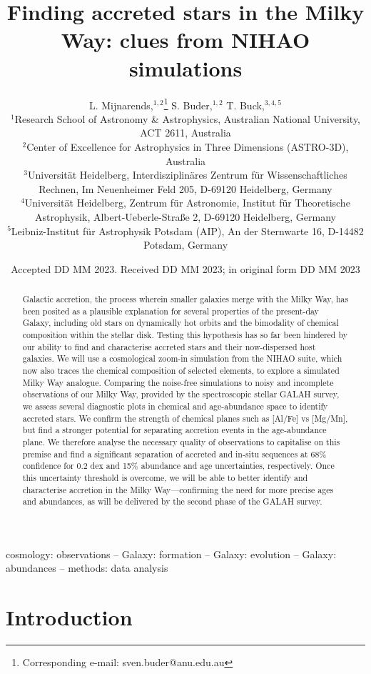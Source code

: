 \documentclass[fleqn,usenatbib]{mnras}
\title[Accreted stars in NIHAO and GALAH]{Finding accreted stars in the Milky Way: clues from NIHAO simulations}
\author[L. Mijnarends, S. Buder and T. Buck]{
L. Mijnarends,$^{1,2}$\thanks{Corresponding e-mail: sven.buder@anu.edu.au}
S. Buder,$^{1,2}$
T. Buck,$^{3,4,5}$
\\
$^{1}$Research School of Astronomy \& Astrophysics, Australian National University, ACT 2611, Australia\\
$^{2}$Center of Excellence for Astrophysics in Three Dimensions (ASTRO-3D), Australia\\
$^{3}$Universit{\"a}t Heidelberg, Interdisziplin{\"a}res Zentrum f{\"u}r Wissenschaftliches Rechnen, Im Neuenheimer Feld 205, D-69120 Heidelberg, Germany\\
$^{4}$Universit{\"a}t Heidelberg, Zentrum f{\"u}r Astronomie, Institut f{\"u}r Theoretische Astrophysik, Albert-Ueberle-Straße 2, D-69120 Heidelberg, Germany\\
$^{5}$Leibniz-Institut f{\"u}r Astrophysik Potsdam (AIP), An der Sternwarte 16, D-14482 Potsdam, Germany
}
\date{Accepted DD MM 2023. Received DD MM 2023; in original form DD MM 2023}
\begin{document}
\label{firstpage}
\pagerange{\pageref{firstpage}--\pageref{lastpage}}
\maketitle

\begin{abstract}
Galactic accretion, the process wherein smaller galaxies merge with the Milky Way, has been posited as a plausible explanation for several properties of the present-day Galaxy, including old stars on dynamically hot orbits and the bimodality of chemical composition within the stellar disk. Testing this hypothesis has so far been hindered by our ability to find and characterise accreted stars and their now-dispersed host galaxies. We will use a cosmological zoom-in simulation from the NIHAO suite, which now also traces the chemical composition of selected elements, to explore a simulated Milky Way analogue. Comparing the noise-free simulations to noisy and incomplete observations of our Milky Way, provided by the spectroscopic stellar GALAH survey, we assess several diagnostic plots in chemical and age-abundance space to identify accreted stars. We confirm the strength of chemical planes such as [Al/Fe] vs [Mg/Mn], but find a stronger potential for separating accretion events in the age-abundance plane. We therefore analyse the necessary quality of observations to capitalise on this premise and find a significant separation of accreted and in-situ sequences at 68\% confidence for 0.2 dex and 15\% abundance and age uncertainties, respectively. Once this uncertainty threshold is overcome, we will be able to better identify and characterise accretion in the Milky Way—confirming the need for more precise ages and abundances, as will be delivered by the second phase of the GALAH survey. 
\end{abstract}
\begin{keywords}
cosmology: observations -- Galaxy: formation -- Galaxy: evolution -- Galaxy: abundances -- methods: data analysis
\end{keywords}



\section{Introduction}
\label{sec:intro}
\end{document}
